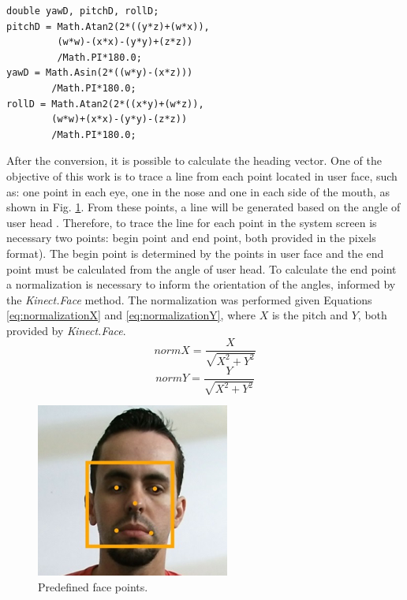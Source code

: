 \documentclass[10pt, conference]{IEEEtran}
\begin{document}
\begin{lstlisting}
double yawD, pitchD, rollD;
pitchD = Math.Atan2(2*((y*z)+(w*x)),
		 (w*w)-(x*x)-(y*y)+(z*z))
         /Math.PI*180.0;
yawD = Math.Asin(2*((w*y)-(x*z)))
		/Math.PI*180.0;
rollD = Math.Atan2(2*((x*y)+(w*z)),
		(w*w)+(x*x)-(y*y)-(z*z))
        /Math.PI*180.0;
\end{lstlisting}

	After the conversion, it is possible to calculate the heading vector. 
	One of the objective of this work is to trace a line from each point located in user face, such as: one point in each eye, one in the nose and one in each side of the mouth, as shown in Fig. \ref{fig:fig5}. 
	From these points, a line will be generated based on the angle of user head . 
	Therefore, to trace the line for each point in the system screen is necessary two points: begin point and end point, both provided in the pixels format). 
	The begin point is determined by the points in user face and the end point must be calculated from the angle of user head. 
	To calculate the end point a normalization is necessary to inform the orientation of the angles, informed by the \emph{Kinect.Face} method. 
	The normalization was performed given Equations \ref{eq:normalizationX} and \ref{eq:normalizationY}, where $X$ is the pitch and $Y$, both provided by \emph{Kinect.Face}.
    \begin{equation}
    	normX = \frac{X}{\sqrt{X^2 + Y^2}}
		\label{eq:normalizationX}
	\end{equation}
    \begin{equation}
    	normY = \frac{Y}{\sqrt{X^2 + Y^2}}    
		\label{eq:normalizationY}
	\end{equation}

    \begin{figure}[t]
        \centering
        \includegraphics{figures/pic5.png}
        \caption{Predefined face points.}
        \label{fig:fig5}
    \end{figure}
\end{document}
